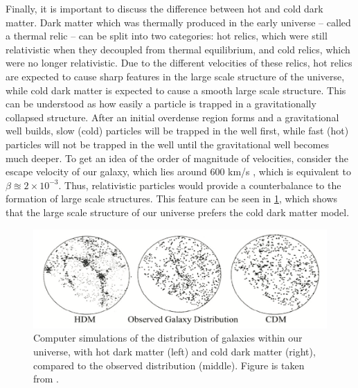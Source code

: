 Finally, it is important to discuss the difference between hot and cold dark matter. Dark matter which was thermally produced in the early universe -- called a thermal relic -- can be split into two categories: hot relics, which were still relativistic when they decoupled from thermal equilibrium, and cold relics, which were no longer relativistic. Due to the different velocities of these relics, hot relics are expected to cause sharp features in the large scale structure of the universe, while cold dark matter is expected to cause a smooth large scale structure. This can be understood as how easily a particle is trapped in a gravitationally collapsed structure. After an initial overdense region forms and a gravitational well builds, slow (cold) particles will be trapped in the well first, while fast (hot) particles will not be trapped in the well until the gravitational well becomes much deeper. To get an idea of the order of magnitude of velocities, consider the escape velocity of our galaxy, which lies around 600 km/s \cite{}, which is equivalent to $\beta \approxeq 2 \times 10^{-3}$. Thus, relativistic particles would provide a counterbalance to the formation of large scale structures. This feature can be seen in \ref{fig:LargeScaleStructure}, which shows that the large scale structure of our universe prefers the cold dark matter model. 

\begin{figure}[h!]
    \centering
    \includegraphics[width=\textwidth]{figures/Galaxy_distributions_by_DM_type.png}
    \caption{Computer simulations of the distribution of galaxies within our universe, with hot dark matter (left) and cold dark matter (right), compared to the observed distribution (middle). Figure is taken from \cite{Ibarra_neutrinos}. }
    \label{fig:LargeScaleStructure}
\end{figure}


